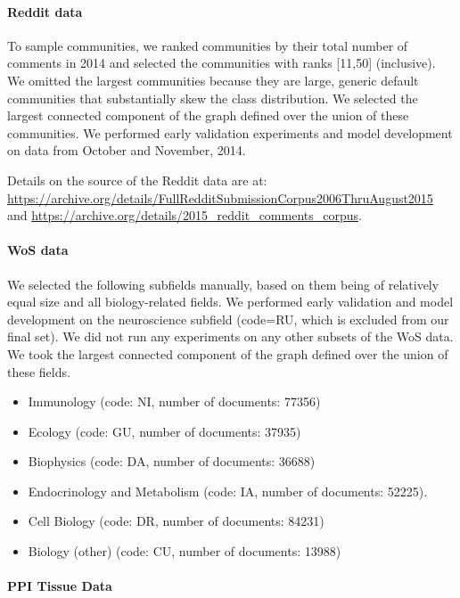 \paragraph{Reddit data}

To sample communities, we ranked communities by their total number of comments in 2014 and selected the communities with ranks [11,50] (inclusive).
We omitted the largest communities because they are large, generic default communities that substantially skew the class distribution.  
We selected the largest connected component of the graph defined over the union of these communities. 
We performed early validation experiments and model development on data from October and November, 2014. 

Details on the source of the Reddit data are at: \url{https://archive.org/details/FullRedditSubmissionCorpus2006ThruAugust2015} and
\url{https://archive.org/details/2015_reddit_comments_corpus}.

\paragraph{WoS data}

We selected the following subfields manually, based on them being of relatively equal size and all biology-related fields.
We performed early validation and model development on the neuroscience subfield (code=RU, which is excluded from our final set). 
We did not run any experiments on any other subsets of the WoS data. 
We took the largest connected component of the graph defined over the union of these fields. 
\begin{itemize}
\item
Immunology (code: NI, number of documents: 77356)
\item
Ecology (code: GU, number of documents: 37935)
\item
Biophysics (code: DA, number of documents: 36688)
\item
Endocrinology and Metabolism (code: IA, number of documents: 52225). 
\item
Cell Biology (code: DR, number of documents: 84231)
\item
Biology (other) (code: CU, number of documents: 13988)
\end{itemize}

\paragraph{PPI Tissue Data}

